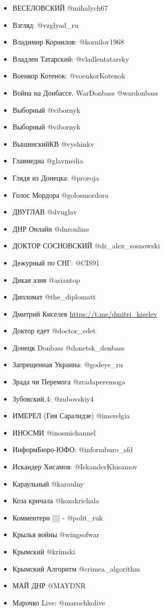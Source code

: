 \documentclass[a4paper,11pt]{book}
\begin{document}
\begin{itemize}
\item ВЕСЕЛОВСКИЙ @mihalych67
\item Взгляд: @vzglyad\_ru
\item Владимир Корнилов: @kornilov1968 
\item Владлен Татарский: @vladlentatarsky 
\item Военкор Котенок: @voenkorKotenok
\item Война на Донбассе. WarDonbass @wardonbass
\item Выборный @vibornyk
\item Выборный @vibornyk
\item ВышинскийКВ @vyshinkv
\item Главмедиа @glavmedia
\item Глядя из Донецка: @proroja
\item Голос Мордора @golosmordora
\item ДВУГЛАВ @dvuglav
\item ДНР Онлайн @dnronline
\item ДОКТОР СОСНОВСКИЙ @dr\_alex\_sosnowski
\item Дежурный по СНГ: @CIS91
\item Дикая азия @asiantop 
\item Дипломат @the\_diplomatt
\item Дмитрий Киселев \url{https://t.me/dmitri\_kiselev}
\item Доктор едет @doctor\_edet
\item Донецк Donbass @donetsk\_donbass
\item Запрещенная Украина: @godeye\_ru
\item Зрада чи Перемога @zradaperemoga
\item Зубовский,4: @zubovskiy4
\item ИМЕРЕЛ (Гия Саралидзе) @imerelgia 
\item ИНОСМИ @inosmichannel
\item ИнформБюро-ЮФО: @informburo\_sfd
\item Искандер Хисамов: @IskanderKhisamov
\item Караульный @karaulny 
\item Коза кричала @kozakrichala
\item Комментерн |||| - @polit\_ruk
\item Крылья войны @wingsofwar
\item Крымский @krimski
\item Крымский Алгоритм @crimea\_algorithm
\item МАЙ ДНР @MAYDNR
\item Марочко Live: @marochkolive

\end{itemize}
\end{document}
